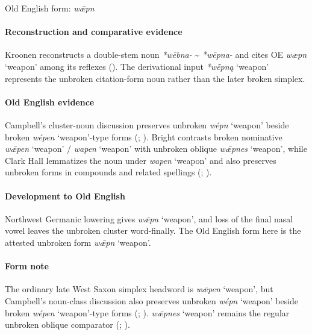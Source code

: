 \documentclass[
  british,
  a4paper,
]{article}
\providecommand{\Recon}[1]{\emph{*#1}}
\begin{document}
Old English form: \emph{wǣpn}

\paragraph{Reconstruction and comparative
evidence}\label{reconstruction-and-comparative-evidence-75}

Kroonen reconstructs a double-stem noun \emph{*wēbna-} \textasciitilde{}
\emph{*wēpna-} and cites OE \emph{wæpn} `weapon' among its reflexes
(). The derivational input
\Recon{wḗpną} `weapon' represents the unbroken citation-form noun rather
than the later broken simplex.

\paragraph{Old English evidence}\label{old-english-evidence-77}

Campbell's cluster-noun discussion preserves unbroken \emph{wépn}
`weapon' beside broken \emph{wépen} `weapon'-type forms
(;
). Bright contrasts broken
nominative \emph{wǣpen} `weapon' / \emph{wapen} `weapon' with unbroken
oblique \emph{wǣpnes} `weapon', while Clark Hall lemmatizes the noun
under \emph{wapen} `weapon' and also preserves unbroken forms in
compounds and related spellings
(;
).

\paragraph{Development to Old
English}\label{development-to-old-english-76}

Northwest Germanic lowering gives \emph{wǣpn} `weapon', and loss of the
final nasal vowel leaves the unbroken cluster word-finally. The Old
English form here is the attested unbroken form \emph{wǣpn} `weapon'.

\paragraph{Form note}\label{form-note-25}

The ordinary late West Saxon simplex headword is \emph{wǣpen} `weapon',
but Campbell's noun-class discussion also preserves unbroken \emph{wépn}
`weapon' beside broken \emph{wépen} `weapon'-type forms
(;
). \emph{wǣpnes} `weapon'
remains the regular unbroken oblique comparator
(;
).
\end{document}
